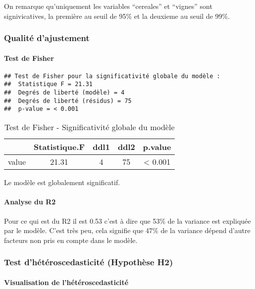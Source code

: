\documentclass[
]{article}
\begin{document}
On remarque qu'uniquement les variables ``cereales'' et ``vignes'' sont
signivicatives, la première au seuil de 95\% et la deuxieme au seuil de
99\%.

\subsubsection{Qualité d'ajustement}\label{qualituxe9-dajustement}

\paragraph{Test de Fisher}\label{test-de-fisher}

\begin{verbatim}
## Test de Fisher pour la significativité globale du modèle :
##  Statistique F = 21.31 
##  Degrés de liberté (modèle) = 4 
##  Degrés de liberté (résidus) = 75 
##  p-value = < 0.001
\end{verbatim}

\begin{longtable}[t]{lcccc}
\caption{\label{tab:unnamed-chunk-8}Test de Fisher - Significativité globale du modèle}\\
\toprule
 & Statistique.F & ddl1 & ddl2 & p.value\\
\midrule
value & 21.31 & 4 & 75 & < 0.001\\
\bottomrule
\end{longtable}

Le modèle est globalement significatif.

\paragraph{Analyse du R2}\label{analyse-du-r2}

Pour ce qui est du R2 il est 0.53 c'est à dire que 53\% de la variance
est expliquée par le modèle. C'est très peu, cela signifie que 47\% de
la variance dépend d'autre facteurs non pris en compte dans le modèle.

\subsubsection{Test d'hétéroscedasticité (Hypothèse
H2)}\label{test-dhuxe9tuxe9roscedasticituxe9-hypothuxe8se-h2}

\paragraph{Visualisation de
l'hétéroscedasticité}\label{visualisation-de-lhuxe9tuxe9roscedasticituxe9}
\end{document}
